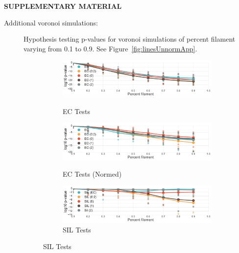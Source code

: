 \documentclass[12pt]{article}
\newcommand{\figref}[1]{Figure~\ref{#1}}
\begin{document}

\bigskip
\begin{center}
{\large\bf SUPPLEMENTARY MATERIAL}
\end{center}

\begin{description}
  \item[Additional voronoi simulations:] Hypothesis testing p-values for voronoi simulations of percent filament varying from 0.1 to 0.9. See \figref{fig:linesUnnormApp}.

  \begin{center}
    \begin{figure}[htp!]
      \centering
      \begin{subfigure}{.45\textwidth}
        \centering
        \caption{EC Tests}
        \includegraphics[width=\linewidth]{figure_8_all_euler_group.pdf}
        \label{fig:all_euler}
      \end{subfigure}
      \begin{subfigure}{.45\textwidth}
        \centering
        \caption{EC Tests (Normed)}
        \includegraphics[width=\linewidth]{figure_8_all_euler_group_normed.pdf}
        \label{fig:all_euler_normed}
      \end{subfigure}
      \begin{subfigure}{.45\textwidth}
        \centering
        \caption{SIL Tests}
        \includegraphics[width=\linewidth]{figure_8_all_silhouette_group.pdf}

\end{subfigure}
\end{figure}
\end{center}
\end{description}
\end{document}
